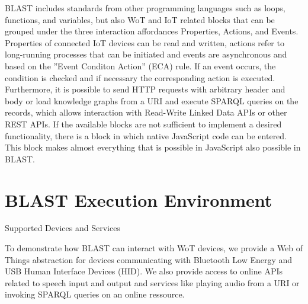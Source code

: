\documentclass[runningheads]{llncs}
\begin{document}
BLAST includes standards from other programming languages such as loops, functions, and variables, but also WoT and IoT related blocks that can be grouped under the three interaction affordances Properties, Actions, and Events.
Properties of connected IoT devices can be read and written, actions refer to long-running processes that can be initiated and events are asynchronous and based on the ''Event Conditon Action'' (ECA) rule.
If an event occurs, the condition is checked and if necessary the corresponding action is executed.
Furthermore, it is possible to send HTTP requests with arbitrary header and body or load knowledge graphs from a URI and execute SPARQL queries on the records, which allows interaction with Read-Write Linked Data APIs or other REST APIs.
If the available blocks are not sufficient to implement a desired functionality, there is a block in which native JavaScript code can be entered.
This block makes almost everything that is possible in JavaScript also possible in BLAST.

\section{BLAST Execution Environment}

Supported Devices and Services

To demonstrate how BLAST can interact with WoT devices, we provide a Web of Things abstraction for devices communicating with Bluetooth Low Energy and USB Human Interface Devices (HID).
We also provide access to online APIs related to speech input and output and services like playing audio from a URI or invoking SPARQL queries on an online ressource.
\end{document}
